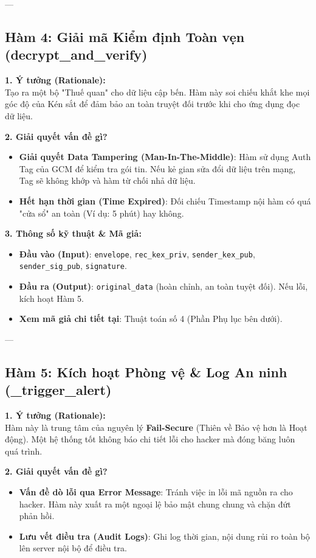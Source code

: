 \documentclass[11pt,a4paper]{article}
\begin{document}
---

\subsection{Hàm 4: Giải mã Kiểm định Toàn vẹn (decrypt\_and\_verify)}

\textbf{1. Ý tưởng (Rationale):} \\
Tạo ra một bộ "Thuế quan" cho dữ liệu cập bến. Hàm này soi chiếu khắt khe mọi góc độ của Kén sắt để đảm bảo an toàn truyệt đối trước khi cho ứng dụng đọc dữ liệu.

\textbf{2. Giải quyết vấn đề gì?}
\begin{itemize}[noitemsep]
    \item \textbf{Giải quyết Data Tampering (Man-In-The-Middle)}: Hàm sử dụng Auth Tag của GCM để kiểm tra gói tin. Nếu kẻ gian sửa đổi dữ liệu trên mạng, Tag sẽ không khớp và hàm từ chối nhả dữ liệu.
    \item \textbf{Hết hạn thời gian (Time Expired)}: Đối chiếu Timestamp nội hàm có quá "cửa sổ" an toàn (Ví dụ: 5 phút) hay không.
\end{itemize}

\textbf{3. Thông số kỹ thuật \& Mã giả:}
\begin{itemize}[noitemsep]
    \item \textbf{Đầu vào (Input)}: \texttt{envelope}, \texttt{rec\_kex\_priv}, \texttt{sender\_kex\_pub}, \texttt{sender\_sig\_pub}, \texttt{signature}.
    \item \textbf{Đầu ra (Output)}: \texttt{original\_data} (hoàn chỉnh, an toàn tuyệt đối). Nếu lỗi, kích hoạt Hàm 5.
    \item \textbf{Xem mã giả chi tiết tại}: Thuật toán số 4 (Phần Phụ lục bên dưới).
\end{itemize}

---

\subsection{Hàm 5: Kích hoạt Phòng vệ \& Log An ninh (\_trigger\_alert)}

\textbf{1. Ý tưởng (Rationale):} \\
Hàm này là trung tâm của nguyên lý \textbf{Fail-Secure} (Thiên về Bảo vệ hơn là Hoạt động). Một hệ thống tốt không báo chi tiết lỗi cho hacker mà đóng băng luôn quá trình.

\textbf{2. Giải quyết vấn đề gì?}
\begin{itemize}[noitemsep]
    \item \textbf{Vấn đề dò lỗi qua Error Message}: Tránh việc in lỗi mã nguồn ra cho hacker. Hàm này xuất ra một ngoại lệ bảo mật chung chung và chặn đứt phản hồi.
    \item \textbf{Lưu vết điều tra (Audit Logs)}: Ghi log thời gian, nội dung rủi ro toàn bộ lên server nội bộ để điều tra.
\end{itemize}
\end{document}
